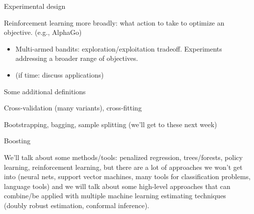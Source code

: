 \documentclass[xcolor={dvipsnames}, handout]{beamer}
\begin{document}

\begin{frame}{Experimental design}

\begin{wideitemize}
\item Reinforcement learning more broadly: what action to take to optimize an objective. \pause (e.g., AlphaGo)\pause
\begin{itemize}
\item Multi-armed bandits: exploration/exploitation tradeoff. \pause Experiments addressing a broader range of objectives. \pause
\item (if time: discuss applications)
\end{itemize}

\end{wideitemize}

\end{frame}



\begin{frame}{Some additional definitions}

\begin{wideitemize}
\item Cross-validation (many variants), cross-fitting \pause
\item Bootstrapping, bagging, sample splitting \pause (we'll get to these next week)\pause
\item Boosting \pause
\item We'll talk about some methods/tools: penalized regression, trees/forests, policy learning, reinforcement learning\pause, but there are a lot of approaches we won't get into (neural nets, support vector machines, many tools for classification problems, language tools) \pause and we will talk about some high-level approaches that can combine/be applied with multiple machine learning estimating techniques (doubly robust estimation, conformal inference). 
\end{wideitemize}

\end{frame}
\end{document}
